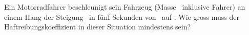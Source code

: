 Ein Motorradfahrer beschleunigt sein Fahrzeug (Masse \mMoO\ inklusive Fahrer) an einem Hang der Steigung \stgO\ in fünf Sekunden von \vAnO\ auf \vEnO. Wie gross muss der Haftreibungskoeffizient in dieser Situation mindestens sein?

